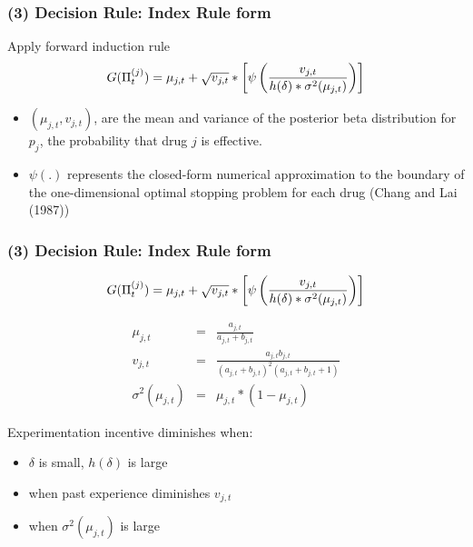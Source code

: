 \begin{frame}[label=RULE]

\frametitle{(3) Decision Rule: Index Rule form}
\small

Apply forward induction rule 
\[
G(\Pi _{t}^{(j)})=\mu _{j,t}+\sqrt{v_{j,t}}*\left[\psi \left( \frac{v_{j,t}}{%
h(\delta)\ast \sigma ^{2}(\mu _{j,t})}\right)\right]
\]

\begin{itemize}
\item $(\mu _{j,t},v_{j,t})$, are the mean and variance of the posterior
beta distribution for $p_{j}$, the probability that drug $j$ is effective.

\item $\psi(.)$ represents the closed-form numerical approximation to the
boundary of the one-dimensional optimal stopping problem for each drug
(Chang and Lai (1987))
\end{itemize}
\end{frame}


\begin{frame}
\frametitle{(3) Decision Rule: Index Rule form}

\[
G(\Pi _{t}^{(j)})=\mu _{j,t}+\sqrt{v_{j,t}}*\left[\psi \left( \frac{v_{j,t}}{%
h(\delta)\ast \sigma ^{2}(\mu _{j,t})}\right)\right]
\]

\begin{eqnarray*}
\mu _{j,t} &=&\frac{a_{j,t}}{a_{j,t}+b_{j,t}} \\
v_{j,t} &=&\frac{a_{j,t}b_{j,t}}{(a_{j,t}+b_{j,t})^{2}(a_{j,t}+b_{j,t}+1)} \\
\sigma ^{2}(\mu _{j,t}) &=&\mu _{j,t}\ast (1-\mu _{j,t})
\end{eqnarray*}

Experimentation incentive diminishes when:

\begin{itemize}
\item $\delta $ is small, $h(\delta)$ is large

\item when past experience diminishes $v_{j,t}$

\item when $\sigma ^{2}(\mu _{j,t})$ is large
\end{itemize}
\end{frame}


